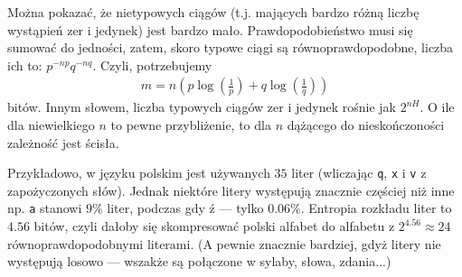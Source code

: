 \documentclass[10pt,a4paper]{article}
\begin{document}
Można pokazać, że nietypowych ciągów (t.j. mających bardzo różną liczbę wystąpień zer i jedynek) jest bardzo mało.
Prawdopodobieństwo musi się sumować do jedności, zatem, skoro typowe ciągi są równoprawdopodobne, liczba ich to:
$p^{-n p}q^{-n q}$.
Czyli, potrzebujemy
%
\begin{align}
    m=n \left( p \log(\tfrac{1}{p}) + q \log(\tfrac{1}{q}) \right)
\end{align}
%
bitów.
Innym słowem, liczba typowych ciągów zer i jedynek rośnie jak $2^{n H}$.
O ile dla niewielkiego $n$ to pewne przybliżenie, to dla $n$ dążącego do nieskończoności zależność jest ścisła.

%
Przykładowo, w języku polskim jest używanych $35$ liter (wliczając \texttt{q}, \texttt{x} i \texttt{v} z zapożyczonych słów).
Jednak niektóre litery występują znacznie częściej niż inne np. \texttt{a} stanowi $9\%$ liter, podczas gdy $\texttt{ź}$ --- tylko $0.06\%$.
Entropia rozkładu liter to $4.56$ bitów, czyli dałoby się skompresować polski alfabet do alfabetu z $2^{4.56}\approx 24$ równoprawdopodobnymi literami.
(A pewnie znacznie bardziej, gdyż litery nie występują losowo --- wszakże są połączone w sylaby, słowa, zdania...)  
\end{document}
